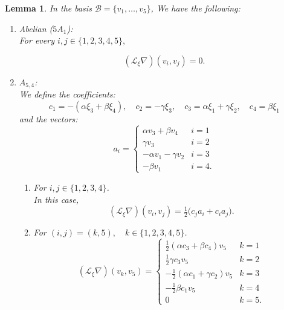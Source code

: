 \documentclass[10pt]{article}
\newtheorem{Lemma}{Lemma}
\begin{document}
\begin{Lemma} \label{lem2}
    In the basis \(\mathcal{B}=\{v_1,\dots,v_5\}\), We have the following:

\begin{enumerate}
  \item Abelian (\(5A_1\)):\\

  For every $i, j\in \{1,2,3,4,5\},$
  
\begin{equation*}
(\mathscr{L}_\xi\nabla)(v_i,v_j)=0.
\end{equation*}
  \item \(A_{5,4}\):\\
  
  We define the coefficients:
\[
c_1 = -(\alpha\xi_3 + \beta\xi_4), \quad
c_2 = -\gamma\xi_3, \quad
c_3 = \alpha\xi_1 + \gamma\xi_2, \quad
c_4 = \beta\xi_1
\]
and the vectors:
\[
a_i =
\begin{cases} 
\alpha v_3 + \beta v_4 & i=1 \\ 
\gamma v_3 & i=2 \\ 
-\alpha v_1 - \gamma v_2 & i=3 \\ 
-\beta v_1 & i=4.
\end{cases}
\]

\begin{enumerate}

\item For $i, j\in \{1,2,3,4\}$.\\

In this case,
\begin{equation*}
(\mathscr{L}_\xi\nabla)(v_i,v_j)=\tfrac{1}{2}\big(c_ja_i+c_ia_j\big).
\end{equation*}

\item For $(i,j)=(k,5),\quad k\in\{1,2,3,4,5\}$.\\ 

\[
(\mathscr{L}_\xi\nabla)(v_k,v_5)=
\begin{cases} 
\tfrac{1}{2}(\alpha c_3+ \beta c_4) v_5 & k=1 \\ 
\tfrac{1}{2}\gamma c_3 v_5 & k=2 \\ 
-\tfrac{1}{2}(\alpha c_1 + \gamma c_2) v_5 & k=3 \\ 
-\tfrac{1}{2}\beta c_1 v_5 & k=4\\
0&k=5.
\end{cases}
\]

\end{enumerate}



\end{enumerate}
\end{Lemma}
\end{document}
